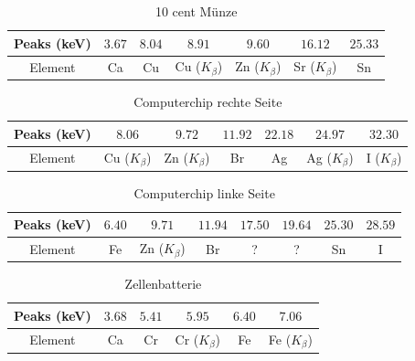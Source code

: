 \documentclass[a4paper,14pt]{article}
\begin{document}
\begin{table}[H]
	\renewcommand{\arraystretch}{1}
	\centering
	\Large
	\begin{adjustbox}{width=\textwidth}
		\begin{tabular}{|c|c|c|c|c|c|c|}
			\hline
			Peaks (keV) & $3.67$ & $8.04$ & $8.91$ & $9.60$ & $16.12$ & $25.33$ \\
			\hline
			Element & Ca & Cu & Cu ($K_\beta$) & Zn ($K_\beta$) & Sr ($K_\beta$) & Sn \\
			\hline
		\end{tabular}
	\end{adjustbox}
	\caption{ 10 cent M\"unze}
	\label{tab: }
\end{table}
\begin{table}[H]
	\renewcommand{\arraystretch}{1}
	\centering
	\Large
	\begin{adjustbox}{width=\textwidth}
		\begin{tabular}{|c|c|c|c|c|c|c|}
			\hline
			Peaks (keV) & $8.06$ & $9.72$ & $11.92$ & $22.18$ & $24.97$ & $32.30$ \\
			\hline
			Element & Cu ($K_\beta$) & Zn ($K_\beta$) & Br & Ag & Ag ($K_\beta$) & I ($K_\beta$) \\
			\hline
		\end{tabular}
	\end{adjustbox}
	\caption{ Computerchip rechte Seite }
	\label{tab: }
\end{table}
\begin{table}[H]
	\renewcommand{\arraystretch}{1}
	\centering
	\Large
	\begin{adjustbox}{width=\textwidth}
		\begin{tabular}{|c|c|c|c|c|c|c|c|}
			\hline
			Peaks (keV) & $6.40$ & $9.71$ & $11.94$ & $17.50$ & $19.64$ & $25.30$ & $28.59$ \\
			\hline
			Element & Fe & Zn ($K_\beta$) & Br & ? & ? & Sn & I \\
			\hline
		\end{tabular}
	\end{adjustbox}
	\caption{ Computerchip linke Seite }
	\label{tab: }
\end{table}
\begin{table}[H]
	\renewcommand{\arraystretch}{1}
	\centering
	\Large
	\begin{adjustbox}{width=\textwidth}
		\begin{tabular}{|c|c|c|c|c|c|}
			\hline
			Peaks (keV) & $3.68$ & $5.41$ & $5.95$ & $6.40$ & $7.06$ \\
			\hline
			Element & Ca & Cr & Cr ($K_\beta$) & Fe  & Fe ($K_\beta$) \\
			\hline
		\end{tabular}
	\end{adjustbox}
	\caption{ Zellenbatterie }
	\label{tab: }
\end{table}
\end{document}
